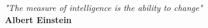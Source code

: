 
\cleardoublepage
{}
\thispagestyle{empty}

\vspace*{\fill}
\begingroup
\centering
\begin{flushright}
    \emph{"The measure of intelligence is the ability to change"}\\
    {\bfseries{Albert Einstein}}
\end{flushright}
\endgroup
\vspace*{\fill}





\newpage

